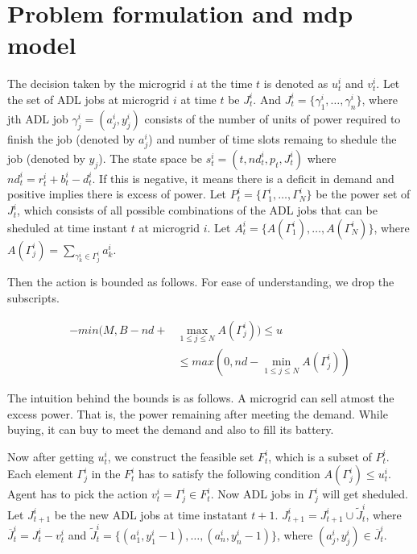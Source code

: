 \section{Problem formulation and mdp model}





The decision taken by the microgrid $i$ at the time $t$ is denoted as $u_{t}^{i}$ and $v_{t}^{i}$.
Let the set of ADL jobs at microgrid $i$ at time $t$ be $J_{t}^{i}$. And  $J_{t}^{i}= \{\gamma_{1}^{i},\ldots,\gamma_{n}^{i}\}$, where jth ADL job $\gamma_{j}^{i} = (a_{j}^{i}, y_{j}^{i})$ consists of the number of units of power required to finish the job (denoted by  $a_{j}^{i}$) and number of time slots remaing to shedule the  job (denoted by  $y_{j}$).
The state space be $s_{t}^{i} = (t,nd_{t}^{i},p_{t}, J_{t}^{i})$ where $nd_{t}^{i} = r_{t}^{i} + b_{t}^{i} - d_{t}^{i}$. If this is negative, it means there is a deficit in demand and positive implies there is excess of power.
Let $P_{t}^{i} = \{\Gamma_{1}^{i},\ldots,\Gamma_{N}^{i}\}$ be the power set of $J_{t}^{i}$, which consists of all possible combinations of the ADL jobs that can be sheduled at time instant $t$ at microgrid $i$. 
Let  $A_{t}^{i} = \{A(\Gamma_{1}^{i}),\ldots,A(\Gamma_{N}^{i})\} $, where $A(\Gamma_{j}^{i}) = \sum_{\gamma_{k}^{i} \in \Gamma_{j}^{i} } a_{k}^{i}$.


Then the action is bounded as follows. For ease of understanding, we drop the subscripts.  

\begin{align}
-min(M, B - nd + &\max_{1\leq j \leq N} A(\Gamma_{j}^{i}) ) \leq u \nonumber\\ &\leq max(0, nd - \min_{1\leq j \leq N} A(\Gamma_{j}^{i}))
\end{align}

The intuition behind the bounds is as follows. A microgrid can sell atmost the excess power. That is, the power remaining after meeting the demand. While buying, it can buy to meet the demand and also to fill its battery.

Now after getting $u_{t}^{i}$, we construct the feasible set $F_{t}^{i}$, which is a subset of $P_{t}^{i}$. Each element $\Gamma_{j}^{i}$ in the $F_{t}^{i}$ has to satisfy the following condition $A(\Gamma_{j}^{i}) \leq u_{t}^{i} $.
Agent has to pick the action $v_{t}^{i} = \Gamma_{j}^{i} \in F_{t}^{i}$. Now ADL jobs in $\Gamma_{j}^{i}$ will get sheduled. Let $J_{t+1}^{i}$ be the new ADL jobs at time instatant $t+1$. $J_{t+1}^{i} = J_{t+1}^{i} \cup \widetilde J_{t}^{i}$, where $\overline J_{t}^{i} = J_{t}^{i} - v_{t}^{i}$ and $\widetilde J_{t}^{i} =  \{(a_{1}^{i}, y_{1}^{i} - 1),\ldots,(a_{n}^{i}, y_{n}^{i} - 1)\}$, where $ (a_{j}^{i}, y_{j}^{i}) \in \overline J_{t}^{i}$.

